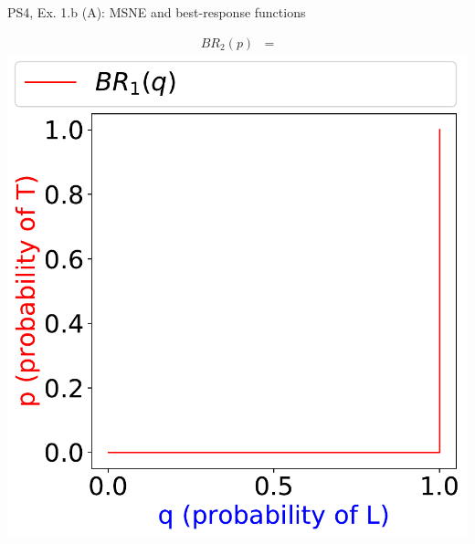 \begin{frame}{PS4, Ex. 1.b (A): MSNE and best-response functions}
\begin{multicols}{2}
\begin{align*}
      BR_2(p)&=
    \end{align*}
    \vspace{-8pt}
    \includegraphics[width=\columnwidth]{figures/1b_}
  \vfill\null
  \end{multicols}
\end{frame}
